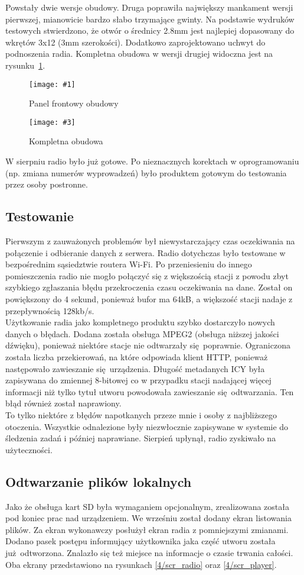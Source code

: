 \documentclass[polish]{aghengthesis}
\newcommand{\imgintss}[5]{
	\begin{figure}[{#5}]
		\centering
		\begin{minipage}{.45\textwidth}
			\centering
			\texttt{[image: \#1]}
			\caption{#2}
			\label{#1}
		\end{minipage}%
		\hfill
		\begin{minipage}{.45\textwidth}
			\centering
			\texttt{[image: \#3]}
			\caption{#4}
			\label{#3}
		\end{minipage}
	\end{figure}
}
\newcommand{\imghss}[4]{\imgintss{#1}{#2}{#3}{#4}{H}}
\begin{document}
			Powstały dwie wersje obudowy. Druga poprawiła największy mankament wersji pierwszej, mianowicie bardzo słabo trzymające gwinty. Na podstawie wydruków testowych stwierdzono, że otwór o średnicy 2.8mm jest najlepiej dopasowany do wkrętów 3x12 (3mm szerokości). Dodatkowo zaprojektowano uchwyt do podnoszenia radia. Kompletna obudowa w wersji drugiej widoczna jest na rysunku~\ref{4/case2}.
			
			\imghss{4/case1}{Panel frontowy obudowy}{4/case2}{Kompletna obudowa}
			
			W sierpniu radio było już gotowe. Po nieznacznych korektach w oprogramowaniu (np. zmiana numerów wyprowadzeń) było produktem gotowym do testowania przez osoby postronne.

		\subsection{Testowanie}
			Pierwszym z zauważonych problemów był niewystarczający czas oczekiwania na połączenie i odbieranie danych z serwera. Radio dotychczas było testowane w bezpośrednim sąsiedztwie routera Wi-Fi. Po przeniesieniu do innego pomieszczenia radio nie mogło połączyć się z większością stacji z powodu zbyt szybkiego zgłaszania błędu przekroczenia czasu oczekiwania na dane. Został on powiększony do 4 sekund, ponieważ bufor ma 64kB, a większość stacji nadaje z przepływnością 128kb/s.
			$ $\\
			
			Użytkowanie radia jako kompletnego produktu szybko dostarczyło nowych danych o błędach. Dodana została obsługa MPEG2 (obsługa niższej jakości dźwięku), ponieważ niektóre stacje nie odtwarzały się poprawnie. Ograniczona została liczba przekierowań, na które odpowiada klient HTTP, ponieważ następowało zawieszanie się urządzenia. Długość metadanych ICY była zapisywana do zmiennej 8-bitowej co w przypadku stacji nadającej więcej informacji niż tylko tytuł utworu powodowała zawieszanie się odtwarzania. Ten błąd również został naprawiony.
			$ $\\
			
			To tylko niektóre z błędów napotkanych przeze mnie i osoby z najbliższego otoczenia. Wszystkie odnalezione były niezwłocznie zapisywane w systemie do śledzenia zadań i później naprawiane. Sierpień upłynął, radio zyskiwało na użyteczności.
			
		\subsection{Odtwarzanie plików lokalnych}
			Jako że obsługa kart SD była wymaganiem opcjonalnym, zrealizowana została pod koniec prac nad urządzeniem. We wrześniu został dodany ekran listowania plików. Za ekran wykonawczy posłużył ekran radia z pomniejszymi zmianami. Dodano pasek postępu informujący użytkownika jaka część utworu została już odtworzona. Znalazło się też miejsce na informacje o czasie trwania całości. Oba ekrany przedstawiono na rysunkach \ref{4/scr_radio} oraz \ref{4/scr_player}.
			
\end{document}
